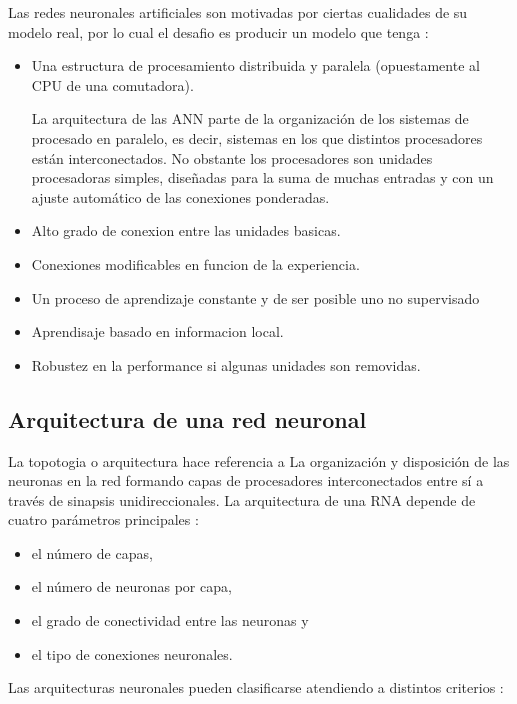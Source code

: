 Las redes neuronales artificiales son motivadas por ciertas cualidades de su modelo real, por lo cual el
desafio es producir un modelo que tenga \cite{nacelle2009redes}:
\begin{itemize}
\item  Una estructura de procesamiento distribuida y paralela (opuestamente al CPU de una comutadora).

La arquitectura de las ANN parte de la organización de los sistemas de procesado en paralelo, es decir, sistemas en los que distintos procesadores están interconectados. No
obstante los procesadores son unidades procesadoras simples, diseñadas para la suma de muchas entradas y con un ajuste automático de las conexiones ponderadas. 
\item Alto grado de conexion entre las unidades basicas.
\item Conexiones modificables en funcion de la experiencia.
\item Un proceso de aprendizaje constante y de ser posible uno no supervisado
\item Aprendisaje basado en informacion local.
\item Robustez en la performance si algunas unidades son removidas.

\end{itemize}

\subsection{Arquitectura de una red neuronal}
La topotogia o arquitectura hace referencia a La organización y disposición de las neuronas en la red formando capas de procesadores interconectados entre sí a través de sinapsis unidireccionales. La arquitectura de una RNA depende de cuatro parámetros principales \cite{lopez2008redes}: 

\begin{itemize}
\item el número de capas,
\item el número de neuronas por capa,
\item el grado de conectividad entre las neuronas y 
\item el tipo de conexiones neuronales. 
\end{itemize}


\vspace{1\baselineskip}
Las arquitecturas neuronales pueden clasificarse atendiendo a distintos criterios \cite{lopez2008redes}:

